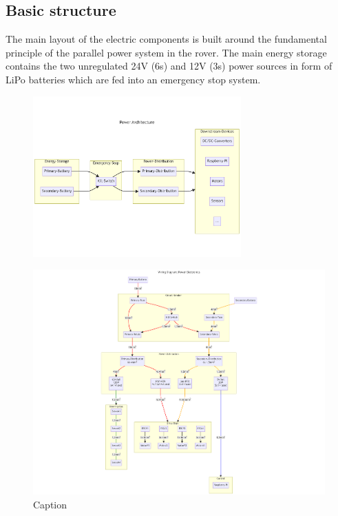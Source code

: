     \clearpage
    \subsection{Basic structure}

    The main layout of the electric components is built around the fundamental principle of the parallel power system in the rover. The main energy storage contains the two unregulated 24V (6s) and 12V (3s) power sources in form of LiPo batteries which are fed into an emergency stop system. 
    
    \begin{figure}[h]
    \includegraphics[width=8cm]{contents/figures/power-architecture.png}
    \label{power_architecture}
    \caption{}
    \end{figure}
    
    
    \clearpage
    \begin{figure}
        \centering
        \includegraphics[scale=\textwidth]{contents/figures/wiring-power.png}
        \caption{Caption}
        \label{wiring_power}
    \end{figure}

